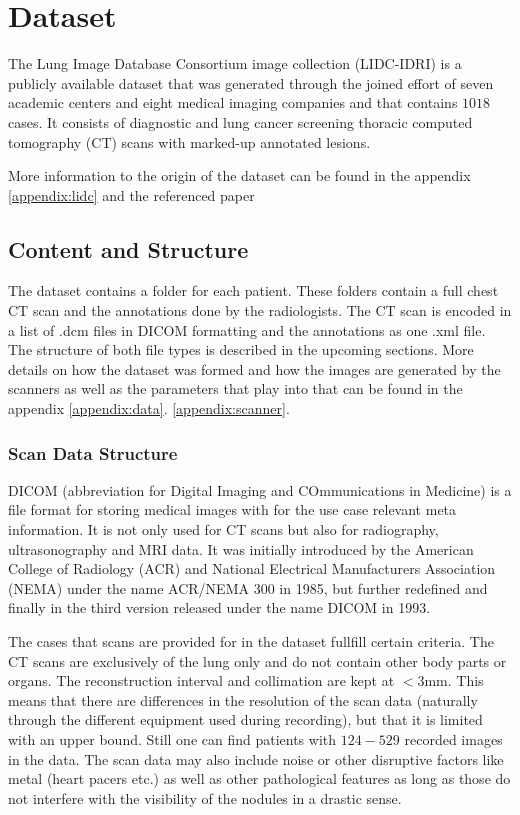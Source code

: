 \documentclass[../Thesis.tex]{subfiles}
\begin{document}
\chapter{Dataset}\label{chap:02data}
The Lung Image Database Consortium image collection (LIDC-IDRI) is a publicly available dataset that was generated through the joined effort of seven academic centers and eight medical imaging companies and that contains $1018$ cases. It consists of diagnostic and lung cancer screening thoracic computed tomography (CT) scans with marked-up annotated lesions.

More information to the origin of the dataset can be found in the appendix \ref{appendix:lidc} and the referenced paper \cite{armato2011lung}

\section{Content and Structure}
The dataset contains a folder for each patient. These folders contain a full chest CT scan and the annotations done by the radiologists. The CT scan is encoded in a list of .dcm files in DICOM formatting and the annotations as one .xml file. The structure of both file types is described in the upcoming sections. More details on how the dataset was formed and how the images are generated by the scanners as well as the parameters that play into that can be found in the appendix \ref{appendix:data}. \ref{appendix:scanner}.

\subsection{Scan Data Structure}
DICOM (abbreviation for Digital Imaging and COmmunications in Medicine) is a file format for storing medical images with for the use case relevant meta information. It is not only used for CT scans but also for radiography, ultrasonography and MRI data. It was initially introduced by the American College of Radiology (ACR) and National Electrical Manufacturers Association (NEMA) under the name ACR/NEMA 300 in 1985, but further redefined and finally in the third version released under the name DICOM in 1993\cite{pianykh2008}.

The cases that scans are provided for in the dataset fullfill certain criteria. The CT scans are exclusively of the lung only and do not contain other body parts or organs. The  reconstruction interval and collimation are kept at $<3$mm. This means that there are differences in the resolution of the scan data (naturally through the different equipment used during recording), but that it is limited with an upper bound. Still one can find patients with $124-529$ recorded images in the data. The scan data may also include noise or other disruptive factors like metal (heart pacers etc.) as well as other pathological features as long as those do not interfere with the visibility of the nodules in a drastic sense.
\end{document}
